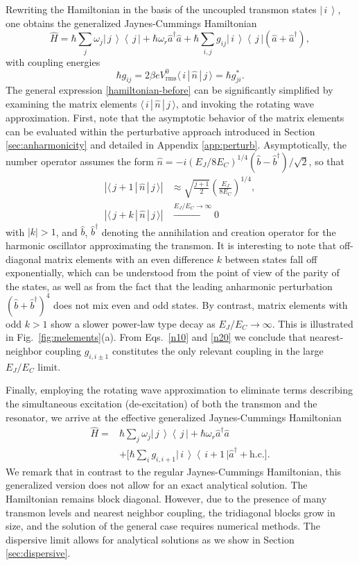 \documentclass[twocolumn,amsmath,amssymb,floatfix,pra,showpacs,eqsecnum,footinbib,superscriptaddress]{revtex4}
\newcounter{fig}
\newcommand{\abs}[1]{\left|#1\right|}
\newcommand{\bra}[1]{\left\langle \, #1 \,\right|}
\newcommand{\ket}[1]{\left|\, #1 \, \right\rangle}
\newcommand{\boket}[3]{\langle\, #1 \,|\, #2 \,|\, #3 \,\rangle}
\newcommand{\be}{\begin{equation}}
\newcommand{\ee}{\end{equation}}
\begin{document}
Rewriting the Hamiltonian in the basis of the uncoupled transmon states $\ket{i}$, one obtains the generalized Jaynes-Cummings Hamiltonian
\be\label{hamiltonian-before}
\hat{H}= \hbar\sum_j\omega_j \ket{j}\bra{j} +\hbar\omega_r \hat{a}^\dag \hat{a} 
 + \hbar\sum_{i,j}  g_{ij}\ket{i}\bra{j}(\hat{a} +\hat{a}^\dag),
\ee
with coupling energies
\be\label{couplings}
\hbar g_{ij}=2\beta eV^0_\text{rms}\boket{i}{\hat{n}}{j}=\hbar g_{ji}^*.
\ee
The general expression \eqref{hamiltonian-before} can be significantly simplified by examining the matrix elements $\boket{i}{\hat{n}}{j}$, and invoking the rotating wave approximation. First, note that the asymptotic behavior of the matrix elements  can be evaluated within the perturbative approach introduced in Section \ref{sec:anharmonicity} and detailed in Appendix \ref{app:perturb}. Asymptotically, the number operator assumes the form $\hat{n}=-i(E_J/8E_C)^{1/4}(\hat{b}-\hat{b}^\dag)/\sqrt{2}$, so that
\begin{align}\label{n10}
\abs{\boket{j+1}{\hat{n}}{j}}&\approx\sqrt{\frac{j+1}{2}}\left( \frac{E_J}{8E_C} \right)^{1/4},\\ \abs{\boket{j+k}{\hat{n}}{j}}&\xrightarrow{E_J/E_C\to\infty}0\label{n20}
\end{align}
with $\abs{k}>1$, and $\hat{b}$, $\hat{b}^\dag$ denoting the annihilation and creation operator for the harmonic oscillator approximating the transmon. It is interesting to note that off-diagonal matrix elements with an even difference $k$ between states fall off exponentially, which can be understood from the point of view of the parity of the states, as well as from the fact that the leading anharmonic perturbation $(\hat{b}+\hat{b}^\dag)^4$ does not mix even and odd states. By contrast, matrix elements with odd $k>1$ show a slower power-law type decay as $E_J/E_C\to\infty$. This is illustrated  in Fig.~\ref{fig:melements}(a). From Eqs.\ \eqref{n10} and \eqref{n20} we conclude that nearest-neighbor coupling $g_{i,i\pm1}$ constitutes the only relevant coupling in the large $E_J/E_C$ limit. 

Finally, employing the rotating wave approximation to eliminate terms describing the simultaneous excitation (de-excitation) of both the transmon and the resonator, we arrive at the effective generalized Jaynes-Cummings Hamiltonian
\begin{align}
\label{hamiltonian-before2}
\hat{H}=& \hbar\sum_j\omega_j \ket{j}\bra{j} +\hbar\omega_r \hat{a}^\dag \hat{a} \\\nonumber
 &+ \bigg[ \hbar\sum_{i} g_{i,i+1}\ket{i}\bra{i+1}\hat{a}^\dag +\text{h.c.}\bigg].
\end{align}
We remark that in contrast to the regular Jaynes-Cummings Hamiltonian, this generalized version does not allow for an exact analytical solution. The Hamiltonian remains block diagonal. However, due to the presence of many transmon levels and nearest neighbor coupling, the tridiagonal blocks grow in size, and the solution of the general case requires numerical methods. The dispersive limit allows for analytical solutions as we show in Section \ref{sec:dispersive}.
\end{document}
